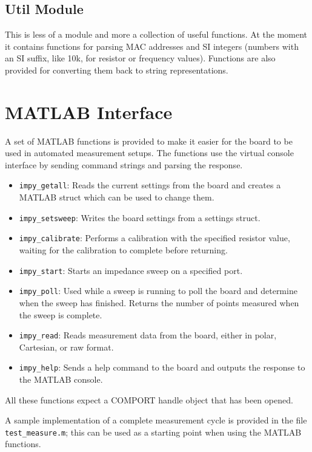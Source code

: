 

\subsection{Util Module}

This is less of a module and more a collection of useful functions. At the moment it contains functions for parsing
MAC addresses and SI integers (numbers with an SI suffix, like 10k, for resistor or frequency values). Functions
are also provided for converting them back to string representations.


\clearpage
\section{MATLAB Interface} \label{sec:matlab}

A set of MATLAB functions is provided to make it easier for the board to be used in automated measurement setups.
The functions use the virtual console interface by sending command strings and parsing the response.
%
\begin{itemize}
	\item \verb!impy_getall!: Reads the current settings from the board and creates a MATLAB struct which can be used to
    change them.
  \item \verb!impy_setsweep!: Writes the board settings from a settings struct.
  \item \verb!impy_calibrate!: Performs a calibration with the specified resistor value, waiting for the calibration to
    complete before returning.
  \item \verb!impy_start!: Starts an impedance sweep on a specified port.
  \item \verb!impy_poll!: Used while a sweep is running to poll the board and determine when the sweep has finished.
    Returns the number of points measured when the sweep is complete.
  \item \verb!impy_read!: Reads measurement data from the board, either in polar, Cartesian, or raw format.
  \item \verb!impy_help!: Sends a help command to the board and outputs the response to the MATLAB console.
\end{itemize}

All these functions expect a COMPORT handle object that has been opened.

A sample implementation of a complete measurement cycle is provided in the file \verb!test_measure.m!; this can be used
as a starting point when using the MATLAB functions.

